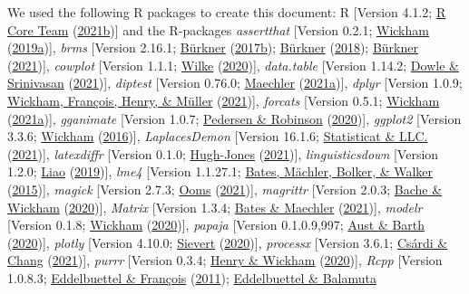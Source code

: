 \documentclass[
  11pt,
  english,
  man,floatsintext]{apa6}
\begin{document}
We used the following R packages to create this document: R {[}Version 4.1.2; \protect\hyperlink{ref-R-base}{R Core Team} (\protect\hyperlink{ref-R-base}{2021b}){]} and the R-packages \emph{assertthat} {[}Version 0.2.1; \protect\hyperlink{ref-R-assertthat}{Wickham} (\protect\hyperlink{ref-R-assertthat}{2019a}){]}, \emph{brms} {[}Version 2.16.1; \protect\hyperlink{ref-R-brms_a}{Bürkner} (\protect\hyperlink{ref-R-brms_a}{2017b}); \protect\hyperlink{ref-R-brms_b}{Bürkner} (\protect\hyperlink{ref-R-brms_b}{2018}); \protect\hyperlink{ref-R-brms_c}{Bürkner} (\protect\hyperlink{ref-R-brms_c}{2021}){]}, \emph{cowplot} {[}Version 1.1.1; \protect\hyperlink{ref-R-cowplot}{Wilke} (\protect\hyperlink{ref-R-cowplot}{2020}){]}, \emph{data.table} {[}Version 1.14.2; \protect\hyperlink{ref-R-data.table}{Dowle \& Srinivasan} (\protect\hyperlink{ref-R-data.table}{2021}){]}, \emph{diptest} {[}Version 0.76.0; \protect\hyperlink{ref-R-diptest}{Maechler} (\protect\hyperlink{ref-R-diptest}{2021a}){]}, \emph{dplyr} {[}Version 1.0.9; \protect\hyperlink{ref-R-dplyr}{Wickham, François, Henry, \& Müller} (\protect\hyperlink{ref-R-dplyr}{2021}){]}, \emph{forcats} {[}Version 0.5.1; \protect\hyperlink{ref-R-forcats}{Wickham} (\protect\hyperlink{ref-R-forcats}{2021a}){]}, \emph{gganimate} {[}Version 1.0.7; \protect\hyperlink{ref-R-gganimate}{Pedersen \& Robinson} (\protect\hyperlink{ref-R-gganimate}{2020}){]}, \emph{ggplot2} {[}Version 3.3.6; \protect\hyperlink{ref-R-ggplot2}{Wickham} (\protect\hyperlink{ref-R-ggplot2}{2016}){]}, \emph{LaplacesDemon} {[}Version 16.1.6; \protect\hyperlink{ref-R-LaplacesDemon}{Statisticat \& LLC.} (\protect\hyperlink{ref-R-LaplacesDemon}{2021}){]}, \emph{latexdiffr} {[}Version 0.1.0; \protect\hyperlink{ref-R-latexdiffr}{Hugh-Jones} (\protect\hyperlink{ref-R-latexdiffr}{2021}){]}, \emph{linguisticsdown} {[}Version 1.2.0; \protect\hyperlink{ref-R-linguisticsdown}{Liao} (\protect\hyperlink{ref-R-linguisticsdown}{2019}){]}, \emph{lme4} {[}Version 1.1.27.1; \protect\hyperlink{ref-R-lme4}{Bates, Mächler, Bolker, \& Walker} (\protect\hyperlink{ref-R-lme4}{2015}){]}, \emph{magick} {[}Version 2.7.3; \protect\hyperlink{ref-R-magick}{Ooms} (\protect\hyperlink{ref-R-magick}{2021}){]}, \emph{magrittr} {[}Version 2.0.3; \protect\hyperlink{ref-R-magrittr}{Bache \& Wickham} (\protect\hyperlink{ref-R-magrittr}{2020}){]}, \emph{Matrix} {[}Version 1.3.4; \protect\hyperlink{ref-R-Matrix}{Bates \& Maechler} (\protect\hyperlink{ref-R-Matrix}{2021}){]}, \emph{modelr} {[}Version 0.1.8; \protect\hyperlink{ref-R-modelr}{Wickham} (\protect\hyperlink{ref-R-modelr}{2020}){]}, \emph{papaja} {[}Version 0.1.0.9,997; \protect\hyperlink{ref-R-papaja}{Aust \& Barth} (\protect\hyperlink{ref-R-papaja}{2020}){]}, \emph{plotly} {[}Version 4.10.0; \protect\hyperlink{ref-R-plotly}{Sievert} (\protect\hyperlink{ref-R-plotly}{2020}){]}, \emph{processx} {[}Version 3.6.1; \protect\hyperlink{ref-R-processx}{Csárdi \& Chang} (\protect\hyperlink{ref-R-processx}{2021}){]}, \emph{purrr} {[}Version 0.3.4; \protect\hyperlink{ref-R-purrr}{Henry \& Wickham} (\protect\hyperlink{ref-R-purrr}{2020}){]}, \emph{Rcpp} {[}Version 1.0.8.3; \protect\hyperlink{ref-R-Rcpp_a}{Eddelbuettel \& François} (\protect\hyperlink{ref-R-Rcpp_a}{2011}); \protect\hyperlink{ref-R-Rcpp_b}{Eddelbuettel \& Balamuta} 
\end{document}

